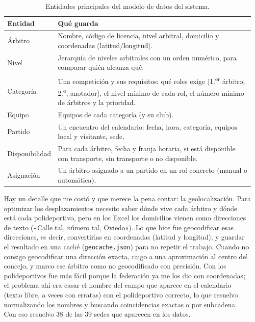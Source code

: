 \documentclass[11pt,a4paper,spanish]{book}
\numberwithin{equation}{chapter}
\numberwithin{figure}{chapter}
\numberwithin{table}{chapter}
\newcommand{\fuente}[1]{\par\vspace{2pt}{\footnotesize\textit{Fuente: #1}}}
\begin{document}
\begin{table}[ht]
\centering
\caption{Entidades principales del modelo de datos del sistema.}
\label{tab:entidades}
\begin{tabular}{@{}p{2.8cm}p{10.5cm}@{}}
\toprule
{\bf Entidad} & {\bf Qué guarda} \\
\midrule
Árbitro & Nombre, código de licencia, nivel arbitral, domicilio y coordenadas (latitud/longitud). \\
Nivel & Jerarquía de niveles arbitrales con un orden numérico, para comparar quién alcanza qué. \\
Categoría & Una competición y sus requisitos: qué roles exige (1.\textsuperscript{er} árbitro, 2.\textsuperscript{o}, anotador), el nivel mínimo de cada rol, el número mínimo de árbitros y la prioridad. \\
Equipo & Equipos de cada categoría (y su club). \\
Partido & Un encuentro del calendario: fecha, hora, categoría, equipos local y visitante, sede. \\
Disponibilidad & Para cada árbitro, fecha y franja horaria, si está disponible con transporte, sin transporte o no disponible. \\
Asignación & Un árbitro asignado a un partido en un rol concreto (manual o automática). \\
\bottomrule
\end{tabular}
\fuente{elaboración propia.}
\end{table}

Hay un detalle que me costó y que merece la pena contar: la geolocalización. Para optimizar los desplazamientos necesito saber dónde vive cada árbitro y dónde está cada polideportivo, pero en los Excel los domicilios vienen como direcciones de texto («Calle tal, número tal, Oviedo»). Lo que hice fue geocodificar esas direcciones, es decir, convertirlas en coordenadas (latitud y longitud), y guardar el resultado en una caché (\texttt{geocache.json}) para no repetir el trabajo. Cuando no consigo geocodificar una dirección exacta, caigo a una aproximación al centro del concejo, y marco ese árbitro como no geocodificado con precisión. Con los polideportivos fue más fácil porque la federación ya me los dio con coordenadas; el problema ahí era casar el nombre del campo que aparece en el calendario (texto libre, a veces con erratas) con el polideportivo correcto, lo que resuelvo normalizando los nombres y buscando coincidencias exactas o por subcadena. Con eso resuelvo 38 de las 39 sedes que aparecen en los datos.
\end{document}
